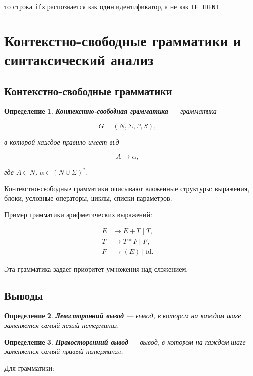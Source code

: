 \documentclass[12pt,a4paper]{article}
\newtheorem{definition}{Определение}
\begin{document}
то строка \texttt{ifx} распознается как один идентификатор, а не как \texttt{IF IDENT}.

\section{Контекстно-свободные грамматики и синтаксический анализ}

\subsection{Контекстно-свободные грамматики}

\begin{definition}
\textbf{Контекстно-свободная грамматика} --- грамматика

\[
G=(N,\Sigma,P,S),
\]

в которой каждое правило имеет вид

\[
A \to \alpha,
\]

где $A \in N$, $\alpha \in (N \cup \Sigma)^*$.
\end{definition}

Контекстно-свободные грамматики описывают вложенные структуры: выражения, блоки, условные операторы, циклы, списки параметров.

Пример грамматики арифметических выражений:

\[
\begin{aligned}
E &\to E + T \mid T,\\
T &\to T * F \mid F,\\
F &\to (E) \mid \mathrm{id}.
\end{aligned}
\]

Эта грамматика задает приоритет умножения над сложением.

\subsection{Выводы}

\begin{definition}
\textbf{Левосторонний вывод} --- вывод, в котором на каждом шаге заменяется самый левый нетерминал.
\end{definition}

\begin{definition}
\textbf{Правосторонний вывод} --- вывод, в котором на каждом шаге заменяется самый правый нетерминал.
\end{definition}

Для грамматики:
\end{document}
